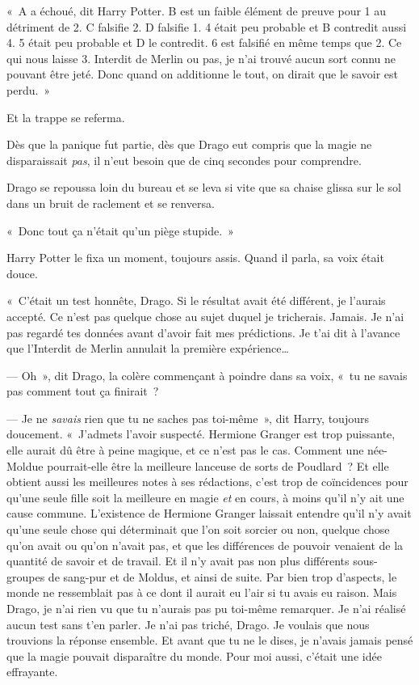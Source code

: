 \baselineskip

\restoretrivseps

«~A a échoué, dit Harry Potter. B est un faible élément de preuve pour 1 au détriment de 2. C falsifie 2. D falsifie 1. 4 était peu probable et B contredit aussi 4. 5 était peu probable et D le contredit. 6 est falsifié en même temps que 2. Ce qui nous laisse 3. Interdit de Merlin ou pas, je n'ai trouvé aucun sort connu ne pouvant être jeté. Donc quand on additionne le tout, on dirait que le savoir est perdu.~»

Et la trappe se referma.

Dès que la panique fut partie, dès que Drago eut compris que la magie ne disparaissait \emph{pas}, il n'eut besoin que de cinq secondes pour comprendre.

Drago se repoussa loin du bureau et se leva si vite que sa chaise glissa sur le sol dans un bruit de raclement et se renversa.

«~Donc tout ça n'était qu'un piège stupide.~»

Harry Potter le fixa un moment, toujours assis. Quand il parla, sa voix était douce.

«~C'était un test honnête, Drago. Si le résultat avait été différent, je l'aurais accepté. Ce n'est pas quelque chose au sujet duquel je tricherais. Jamais. Je n'ai pas regardé tes données avant d'avoir fait mes prédictions. Je t'ai dit à l'avance que l'Interdit de Merlin annulait la première expérience…

--- Oh~», dit Drago, la colère commençant à poindre dans sa voix, «~tu ne savais pas comment tout ça finirait~?

--- Je ne \emph{savais} rien que tu ne saches pas toi-même~», dit Harry, toujours doucement. «~J'admets l'avoir suspecté. Hermione Granger est trop puissante, elle aurait dû être à peine magique, et ce n'est pas le cas. Comment une née-Moldue pourrait-elle être la meilleure lanceuse de sorts de Poudlard~? Et elle obtient aussi les meilleures notes à ses rédactions, c'est trop de coïncidences pour qu'une seule fille soit la meilleure en magie \emph{et} en cours, à moins qu'il n'y ait une cause commune. L'existence de Hermione Granger laissait entendre qu'il n'y avait qu'une seule chose qui déterminait que l'on soit sorcier ou non, quelque chose qu'on avait ou qu'on n'avait pas, et que les différences de pouvoir venaient de la quantité de savoir et de travail. Et il n'y avait pas non plus différents sous-groupes de sang-pur et de Moldus, et ainsi de suite. Par bien trop d'aspects, le monde ne ressemblait pas à ce dont il aurait eu l'air si tu avais eu raison. Mais Drago, je n'ai rien vu que tu n'aurais pas pu toi-même remarquer. Je n'ai réalisé aucun test sans t'en parler. Je n'ai pas triché, Drago. Je voulais que nous trouvions la réponse ensemble. Et avant que tu ne le dises, je n'avais jamais pensé que la magie pouvait disparaître du monde. Pour moi aussi, c'était une idée effrayante.


